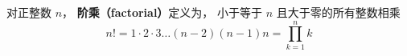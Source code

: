 
\begin{issues}
\issueDraft
\end{issues}

对正整数 $n$， \textbf{阶乘（factorial）}定义为， 小于等于 $n$ 且大于零的所有整数相乘
\begin{equation}
n! = 1 \cdot 2 \cdot 3 \dots (n - 2) (n - 1)n = \prod_{k = 1}^n k
\end{equation}
